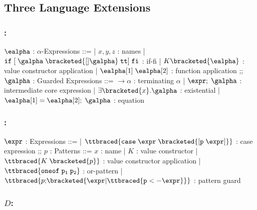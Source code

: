 \documentclass[]{article}
\begin{document}
\subsection{Three Language Extensions}

\subsubsection{{\VMinus}:}

\begin{center}
    \begin{bnf}
    $\ealpha$ : \textsf{$\alpha$-Expressions} ::=
    | $x, y, z$ : names
    | $\tt{if}\; \tt{[}\; \galpha\; \bracketed{[] \galpha}\; tt{]}\; \tt{fi}$ : if-fi 
    | $K \bracketed{\ealpha}$ : value constructor application 
    | $\ealpha[1]\; \ealpha[2]$ : function application 
    ;;
    $\galpha$ : \textsf{Guarded Expressions} ::=  
    $\boldsymbol{\rightarrow}\alpha$ : terminating $\alpha$ 
    | $\expr;\; \galpha$ : intermediate core expression 
    | $\exists \bracketed{x} \tt{.} \galpha$ : existential 
    | $\ealpha[1] = \ealpha[2];\; \galpha$ : equation 
    \end{bnf}
\end{center}

\bigskip 

\subsubsection{{\PPlus}:}
\begin{center}
    \begin{bnf}
$\expr$ : \textsf{Expressions} ::=
    | $\ttbraced{\tt{case}\; \expr\; \bracketed{\tt{[} p\; \expr \tt{]}}}$ : case expression 
    ;;
    $p$ : \textsf{Patterns} ::= $x$ : name 
    | $K$ : value constructor 
    | $\ttbraced{K\; \bracketed{p}}$ : value constructor application 
    | $\ttbraced{\tt{oneof}\; p_{1}\;  p_{2} }$ : or-pattern 
    | $\ttbraced{p \tt{;} \bracketed{\expr \vert \ttbraced{p  <- \expr}}}$ : pattern guard
    \end{bnf}
\end{center}


\bigskip 

\subsubsection{$D$:}
\end{document}
